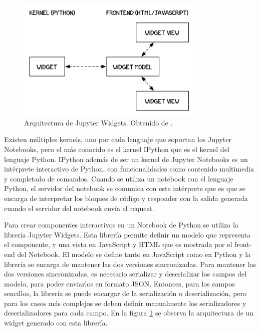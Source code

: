 \begin{figure}[h]
    \centering
    \includegraphics[width=0.8\textwidth]{imagenes/notebook/WidgetModelView}
    \caption[Arquitectura de Jupyter Widgets]{Arquitectura de Jupyter Widgets. Obtenido de \cite{arq-widget}.}
    \label{fig:widget_arq}
\end{figure}

Existen múltiples kernels, uno por cada lenguaje que soportan los Jupyter Notebooks, pero el más conocido es el kernel IPython que es el kernel del lenguaje Python. IPython además de ser un kernel de Jupyter Notebooks es un intérprete interactivo de Python, con funcionalidades como contenido multimedia y completado de comandos. Cuando se utiliza un notebook con el lenguaje Python, el servidor del notebook se comunica con este intérprete que es que se encarga de interpretar los bloques de código y responder con la salida generada cuando el servidor del notebook envía el request.

Para crear componentes interactivos en un Notebook de Python se utiliza la librería Jupyter Widgets. Esta librería permite definir un modelo que representa el componente, y una vista en JavaScript y HTML que es mostrada por el front-end del Notebook. El modelo se define tanto en JavaScript como en Python y la librería se encarga de mantener las dos versiones sincronizadas. Para mantener las dos versiones sincronizadas, es necesario serializar y deserializar los campos del modelo, para poder enviarlos en formato JSON. Entonces, para los campos sencillos, la librería se puede encargar de la serialización o deserialización, pero para los casos más complejos se deben definir manualmente los serializadores y deserializadores para cada campo. En la figura \ref{fig:widget_arq} se observa la arquitectura de un widget generado con esta librería.

